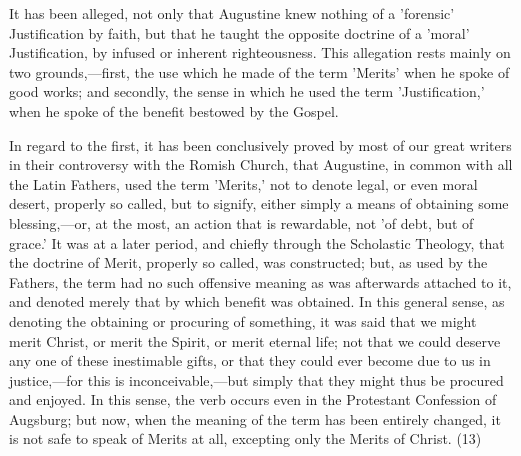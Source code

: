 \documentclass[
]{book}
\begin{document}
It has been alleged, not only that Augustine knew nothing of a 'forensic' Justification by faith, but that he taught the opposite doctrine of a 'moral' Justification, by infused or inherent righteousness. This allegation rests mainly on two grounds,---first, the use which he made of the term 'Merits' when he spoke of good works; and secondly, the sense in which he used the term 'Justification,' when he spoke of the benefit bestowed by the Gospel.

In regard to the first, it has been conclusively proved by most of our great writers in their controversy with the Romish Church, that Augustine, in common with all the Latin Fathers, used the term 'Merits,' not to denote legal, or even moral desert, properly so called, but to signify, either simply a means of obtaining some blessing,---or, at the most, an action that is rewardable, not 'of debt, but of grace.' It was at a later period, and chiefly through the Scholastic Theology, that the doctrine of Merit, properly so called, was constructed; but, as used by the Fathers, the term had no such offensive meaning as was afterwards attached to it, and denoted merely that by which benefit was obtained. In this general sense, as denoting the obtaining or procuring of something, it was said that we might merit Christ, or merit the Spirit, or merit eternal life; not that we could deserve any one of these inestimable gifts, or that they could ever become due to us in justice,---for this is inconceivable,---but simply that they might thus be procured and enjoyed. In this sense, the verb occurs even in the Protestant Confession of Augsburg; but now, when the meaning of the term has been entirely changed, it is not safe to speak of Merits at all, excepting only the Merits of Christ. (13)
\end{document}

